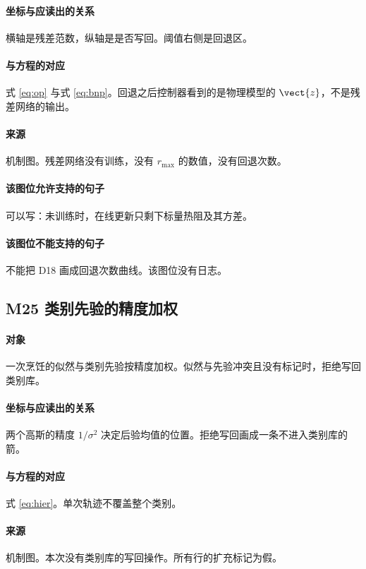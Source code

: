 \paragraph{坐标与应读出的关系}
横轴是残差范数，纵轴是是否写回。阈值右侧是回退区。

\paragraph{与方程的对应}
式 \eqref{eq:op} 与式 \eqref{eq:bnp}。回退之后控制器看到的是物理模型的 $\vect{z}$，不是残差网络的输出。

\paragraph{来源}
机制图。残差网络没有训练，没有 $r_{\max}$ 的数值，没有回退次数。

\paragraph{该图位允许支持的句子}
可以写：未训练时，在线更新只剩下标量热阻及其方差。

\paragraph{该图位不能支持的句子}
不能把 D18 画成回退次数曲线。该图位没有日志。

\subsection{M25 类别先验的精度加权}
\paragraph{对象}
一次烹饪的似然与类别先验按精度加权。似然与先验冲突且没有标记时，拒绝写回类别库。

\paragraph{坐标与应读出的关系}
两个高斯的精度 $1/\sigma^2$ 决定后验均值的位置。拒绝写回画成一条不进入类别库的箭。

\paragraph{与方程的对应}
式 \eqref{eq:hier}。单次轨迹不覆盖整个类别。

\paragraph{来源}
机制图。本次没有类别库的写回操作。所有行的扩充标记为假。

